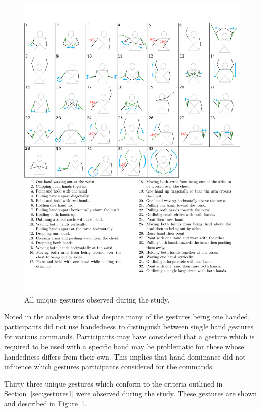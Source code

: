 \documentclass[manuscript, review, screen]{acmart}
\begin{document}
\begin{figure}[p]
   \centering
   \includegraphics[width=1\textwidth]{figures/all_gestures.png}
   \caption{All unique gestures observed during the study.}
   \label{fig:allGestures}
\end{figure}

Noted in the analysis was that despite many of the gestures being one handed, participants did not use handedness to distinguish between single hand gestures for various commands.
Participants may have considered that a gesture which is required to be used with a specific hand may be problematic for those whose handedness differs from their own.
This implies that hand-dominance did not influence which gestures participants considered for the commands.

Thirty three unique gestures which conform to the criteria outlined in Section~\ref{sec:gestures1} were observed during the study.
These gestures are shown and described in Figure~\ref{fig:allGestures}.  
\end{document}
